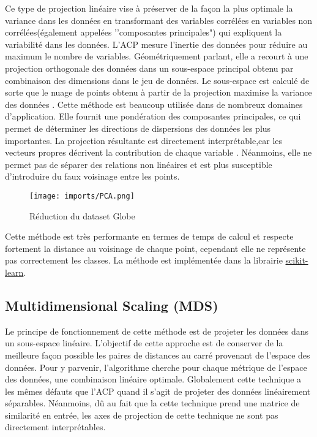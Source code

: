Ce type de projection linéaire vise à préserver de la façon la plus optimale la variance dans les données en transformant des variables corrélées en variables non corrélées(également appelées ’’composantes principales") qui expliquent la variabilité dans les données. L’ACP mesure l’inertie des données pour réduire au maximum le nombre de variables. 
Géométriquement parlant, elle a recourt à une projection orthogonale des données dans un sous-espace principal obtenu par combinaison des dimensions dans le jeu de données. Le sous-espace est calculé de sorte que le nuage de points obtenu à partir de la projection maximise la variance des données \cite{HeulotThese}.\newline
Cette méthode est beaucoup utilisée dans de nombreux domaines d’application. Elle fournit une pondération des composantes principales, ce qui permet de déterminer les directions de dispersions des données les plus importantes.
La projection résultante est directement interprétable,car les vecteurs propres décrivent la contribution de chaque variable \cite{HeulotThese}.
Néanmoins, elle ne permet pas de séparer des relations non linéaires et est plus susceptible d’introduire du faux voisinage entre les points.

\begin{center}
    \begin{figure}[ht!]
        \centering
        
        \texttt{[image: imports/PCA.png]}
        
        \caption{Réduction du dataset Globe}
    \end{figure}
\end{center}

Cette méthode est très performante en termes de temps de calcul et respecte fortement la distance au voisinage de chaque point, cependant elle ne représente pas correctement les classes.
\smallskip
La méthode est implémentée dans la librairie \href{https://scikit-learn.org/stable/modules/generated/sklearn.decomposition.PCA.html}{scikit-learn}.

\subsection{Multidimensional Scaling (MDS)}

Le principe de fonctionnement de cette méthode est de projeter les données dans un sous-espace linéaire\cite{abdi2007-MDS}. L'objectif de cette approche est de conserver de la meilleure façon possible les paires de distances au carré provenant de l’espace des données. 
Pour y parvenir, l'algorithme cherche pour chaque métrique de l'espace des données, une combinaison linéaire optimale. Globalement cette technique a les mêmes défauts que l’ACP quand il s’agit de projeter des données linéairement séparables.
Néanmoins, dû au fait que la cette technique prend une matrice de similarité en entrée, les axes de projection de cette technique ne sont pas directement interprétables\cite{HeulotThese}.


